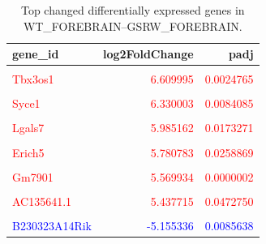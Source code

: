 \documentclass[
  letterpaper,
  DIV=11,
  numbers=noendperiod]{scrartcl}
\begin{document}
\hypertarget{tbl-comparison_1}{}
\begin{table}
\caption{\label{tbl-comparison_1}Top changed differentially expressed genes in
WT\_FOREBRAIN--GSRW\_FOREBRAIN. }\tabularnewline

\centering\begingroup\fontsize{8}{10}\selectfont

\begin{tabular}[t]{lrr}
\toprule
gene\_id & log2FoldChange & padj\\
\midrule
\textcolor{red}{\cellcolor{gray!6}{mt-Ty}} & \textcolor{red}{\cellcolor{gray!6}{6.744684}} & \textcolor{red}{\cellcolor{gray!6}{0.0361441}}\\
\textcolor{red}{Tbx3os1} & \textcolor{red}{6.609995} & \textcolor{red}{0.0024765}\\
\textcolor{red}{\cellcolor{gray!6}{Gm3373}} & \textcolor{red}{\cellcolor{gray!6}{6.357571}} & \textcolor{red}{\cellcolor{gray!6}{0.0056723}}\\
\textcolor{red}{Syce1} & \textcolor{red}{6.330003} & \textcolor{red}{0.0084085}\\
\textcolor{red}{\cellcolor{gray!6}{Cfap221}} & \textcolor{red}{\cellcolor{gray!6}{6.173533}} & \textcolor{red}{\cellcolor{gray!6}{0.0116728}}\\
\addlinespace
\textcolor{red}{Lgals7} & \textcolor{red}{5.985162} & \textcolor{red}{0.0173271}\\
\textcolor{red}{\cellcolor{gray!6}{Krt19}} & \textcolor{red}{\cellcolor{gray!6}{5.799875}} & \textcolor{red}{\cellcolor{gray!6}{0.0261443}}\\
\textcolor{red}{Erich5} & \textcolor{red}{5.780783} & \textcolor{red}{0.0258869}\\
\textcolor{red}{\cellcolor{gray!6}{Trim10}} & \textcolor{red}{\cellcolor{gray!6}{5.744044}} & \textcolor{red}{\cellcolor{gray!6}{0.0295832}}\\
\textcolor{red}{Gm7901} & \textcolor{red}{5.569934} & \textcolor{red}{0.0000002}\\
\addlinespace
\textcolor{red}{\cellcolor{gray!6}{Ccdc178}} & \textcolor{red}{\cellcolor{gray!6}{5.448423}} & \textcolor{red}{\cellcolor{gray!6}{0.0343996}}\\
\textcolor{red}{AC135641.1} & \textcolor{red}{5.437715} & \textcolor{red}{0.0472750}\\
\textcolor{red}{\cellcolor{gray!6}{Tpm3-rs7}} & \textcolor{red}{\cellcolor{gray!6}{5.423427}} & \textcolor{red}{\cellcolor{gray!6}{0.0134045}}\\
\textcolor{blue}{B230323A14Rik} & \textcolor{blue}{-5.155336} & \textcolor{blue}{0.0085638}\\

\end{tabular}
\end{table}
\end{document}
